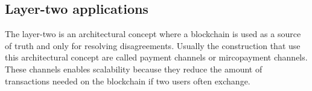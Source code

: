 \subsection{Layer-two applications}

The layer-two is an architectural concept where a blockchain is used as a source
of truth and only for resolving disagreements. Usually the construction that use
this architectural concept are called payment channels or mircopayment channels.
These channels enables scalability because they reduce the amount of transactions
needed on the blockchain if two users often exchange.
